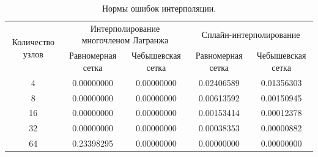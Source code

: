 \documentclass[12pt, a4paper]{article}
\begin{document}
	\begin{table}[H]
		\caption{Нормы ошибок интерполяции.}
		\centering
		\footnotesize
		\begin{tabular}{|c|c|c|c|c|}
			\hline
			\multirow{2}{5em}{Количество узлов} & \multicolumn{2}{|c|}{Интерполирование многочленом Лагранжа}&\multicolumn{2}{|c|}{Сплайн-интерполирование}\\
			\cline{2-5}
			&Равномерная сетка &Чебышевская сетка &Равномерная сетка&Чебышевская сетка\\
			\hline
			4& 0.00000000&0.00000000&0.02406589&0.01356303\\
			\hline
			8&0.00000000&0.00000000&0.00613592&0.00150945\\
			\hline
			16&0.00000000&0.00000000&0.00153414& 0.00012378\\
			\hline
			32&0.00000000&0.00000000&0.00038353&0.00000882\\
			\hline
			64&0.23398295&0.00000000&0.00000000&0.00000000\\
			\hline
		\end{tabular}
	\end{table}
	
\end{document}
